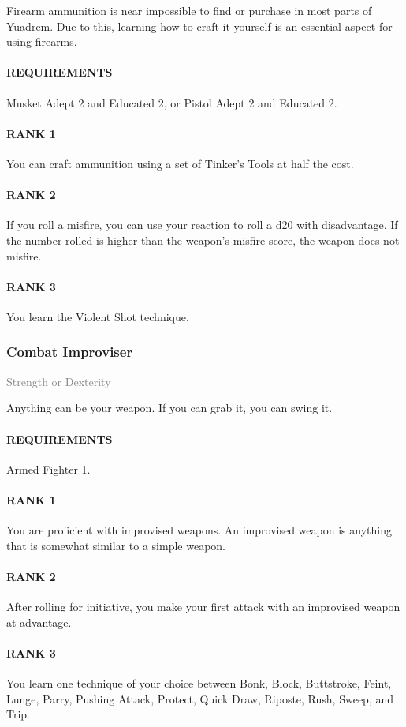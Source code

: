 \normalsize
Firearm ammunition is near impossible to find or purchase in most parts of Yuadrem.
Due to this, learning how to craft it yourself is an essential aspect for using firearms.
\paragraph{REQUIREMENTS} Musket Adept 2 and Educated 2, or Pistol Adept 2 and Educated 2.
\paragraph{RANK 1} You can craft ammunition using a set of Tinker's Tools at half the cost.
\paragraph{RANK 2} If you roll a misfire, you can use your reaction to roll a d20 with disadvantage.
If the number rolled is higher than the weapon's misfire score, the weapon does not misfire.
\paragraph{RANK 3} You learn the Violent Shot technique.
\subsubsection{Combat Improviser} \label{feat::combatimproviser}
\small{\textcolor{gray}{Strength or Dexterity}}

\normalsize
Anything can be your weapon.
If you can grab it, you can swing it.
\paragraph{REQUIREMENTS} Armed Fighter 1.
\paragraph{RANK 1} You are proficient with improvised weapons.
An improvised weapon is anything that is somewhat similar to a simple weapon.
\paragraph{RANK 2} After rolling for initiative, you make your first attack with an improvised weapon at advantage.
\paragraph{RANK 3} You learn one technique of your choice between Bonk, Block, Buttstroke, Feint, Lunge, Parry, Pushing Attack, Protect, Quick Draw, Riposte, Rush, Sweep, and Trip.

